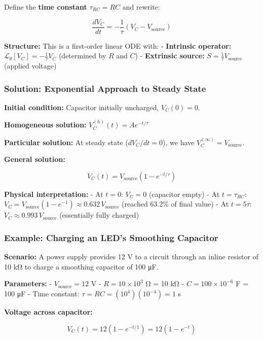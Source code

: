 \documentclass[
]{article}
\begin{document}
Define the \textbf{time constant} \(\tau_{RC} = RC\) and rewrite:

\[\boxed{\frac{dV_C}{dt} = -\frac{1}{\tau}(V_C - V_{\text{source}})}\]

\textbf{Structure:} This is a first-order linear ODE with: -
\textbf{Intrinsic operator:}
\(\mathcal{L}_\theta[V_C] = -\frac{1}{\tau}V_C\) (determined by \(R\)
and \(C\)) - \textbf{Extrinsic source:}
\(S = \frac{1}{\tau}V_{\text{source}}\) (applied voltage)

\subsubsection{Solution: Exponential Approach to Steady
State}\label{solution-exponential-approach-to-steady-state}

\textbf{Initial condition:} Capacitor initially uncharged,
\(V_C(0) = 0\).

\textbf{Homogeneous solution:} \(V_C^{(h)}(t) = Ae^{-t/\tau}\)

\textbf{Particular solution:} At steady state (\(dV_C/dt = 0\)), we have
\(V_C^{(\infty)} = V_{\text{source}}\).

\textbf{General solution:}

\[\boxed{V_C(t) = V_{\text{source}}(1 - e^{-t/\tau})}\]

\textbf{Physical interpretation:} - At \(t = 0\): \(V_C = 0\) (capacitor
empty) - At \(t = \tau_{RC}\):
\(V_C = V_{\text{source}}(1 - e^{-1}) \approx 0.632 \, V_{\text{source}}\)
(reached 63.2\% of final value) - At \(t = 5\tau\):
\(V_C \approx 0.993 \, V_{\text{source}}\) (essentially fully charged)

\subsubsection{Example: Charging an LED's Smoothing
Capacitor}\label{example-charging-an-leds-smoothing-capacitor}

\textbf{Scenario:} A power supply provides 12 V to a circuit through an
inline resistor of 10 kΩ to charge a smoothing capacitor of 100 μF.

\textbf{Parameters:} - \(V_{\text{source}} = 12\) V -
\(R = 10 \times 10^3\) Ω = 10 kΩ - \(C = 100 \times 10^{-6}\) F = 100 μF
- Time constant: \(\tau = RC = (10^4)(10^{-4}) = 1\) s

\textbf{Voltage across capacitor:}

\[V_C(t) = 12(1 - e^{-t/1}) = 12(1 - e^{-t})\]
\end{document}
